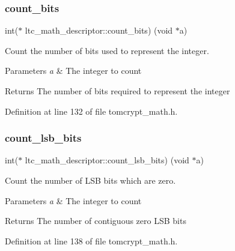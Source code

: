 \subsubsection{\texorpdfstring{count\_bits}{count\_bits}}
{\footnotesize\ttfamily int($\ast$ ltc\+\_\+math\+\_\+descriptor\+::count\+\_\+bits) (void $\ast$a)}



Count the number of bits used to represent the integer. 


\begin{DoxyParams}{Parameters}
{\em a} & The integer to count \\
\hline
\end{DoxyParams}
\begin{DoxyReturn}{Returns}
The number of bits required to represent the integer 
\end{DoxyReturn}


Definition at line 132 of file tomcrypt\+\_\+math.\+h.

\mbox{\label{structltc__math__descriptor_a35b5d101c179e6504397fd7bb9dab0d7}} 
\subsubsection{\texorpdfstring{count\_lsb\_bits}{count\_lsb\_bits}}
{\footnotesize\ttfamily int($\ast$ ltc\+\_\+math\+\_\+descriptor\+::count\+\_\+lsb\+\_\+bits) (void $\ast$a)}



Count the number of L\+SB bits which are zero. 


\begin{DoxyParams}{Parameters}
{\em a} & The integer to count \\
\hline
\end{DoxyParams}
\begin{DoxyReturn}{Returns}
The number of contiguous zero L\+SB bits 
\end{DoxyReturn}


Definition at line 138 of file tomcrypt\+\_\+math.\+h.

\mbox{\label{structltc__math__descriptor_aacc2306d4534b21b76ddd11b54274f31}} 
